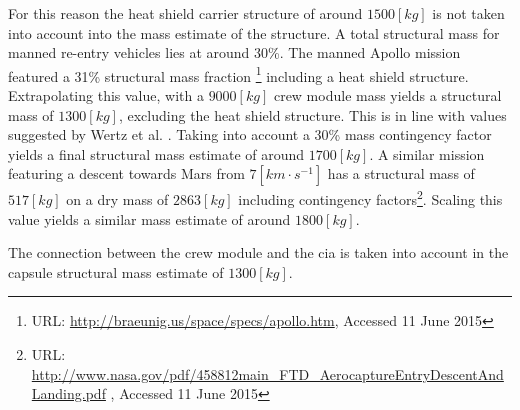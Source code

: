 For this reason the heat shield carrier structure of around $1500 \left[kg\right]$ \cite{Ainsworth2014} is not taken into account into the mass estimate of the structure. A total structural mass for manned re-entry vehicles lies at around 30\%. The manned Apollo mission featured a 31\% structural mass fraction \footnote{URL: \url{http://braeunig.us/space/specs/apollo.htm}, Accessed 11 June 2015} including a heat shield structure. Extrapolating this value, with a $9000 \left[kg\right]$ crew module mass yields a structural mass of $1300 \left[kg\right]$, excluding the heat shield structure. This is in line with values suggested by Wertz et al. \cite{Wertz2011}. Taking into account a 30\% mass contingency factor yields a final structural mass estimate of around $1700 \left[kg\right]$. A similar mission featuring a descent towards Mars from $7 \left[km \cdot s^{-1}\right]$ has a structural mass of $517 \left[kg\right]$ on a dry mass of $2863 \left[kg\right]$ including contingency factors\footnote{URL: \url{http://www.nasa.gov/pdf/458812main\_FTD\_AerocaptureEntryDescentAndLanding.pdf} , Accessed 11 June 2015 }. Scaling this value yields a similar mass estimate of around $1800 \left[kg\right]$. 

The connection between the crew module and the \gls{cia} is taken into account in the capsule structural mass estimate of $1300 \left[kg\right]$.
